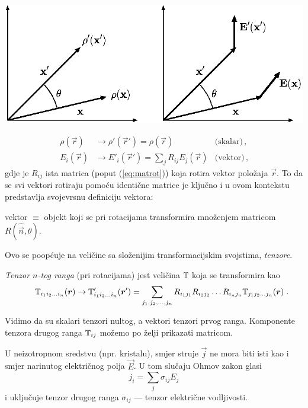 \vspace*{2ex}
\centerline{\includegraphics[scale=0.8]{pics/skalarvektor.eps}}

\begin{align*}
    \rho(\vec{r}) &\to \rho'(\vec{r}') = \rho(\vec{r}) \qquad &\textrm{(skalar)} \,, \\
    E_i(\vec{r}) &\to E'_i(\vec{r}') = \sum_j R_{ij}E_j(\vec{r}) 
                 &\textrm{(vektor)} \,,
\end{align*}
gdje je $R_{ij}$ ista matrica (poput (\ref{eq:matrot})) koja rotira
vektor položaja $\vec{r}$. To da se svi vektori rotiraju pomoću identične
matrice je ključno i u ovom kontekstu predstavlja svojevrsnu definiciju
vektora:
\begin{center}
    {vektor} $\equiv$ {objekt koji se pri rotacijama transformira množenjem matricom}
    $R(\hat{\vec{n}}, \theta)$.
\end{center}
Ovo se poopćuje na veličine sa složenijim transformacijskim svojstima,
\emph{tenzore}. 
\begin{definicija}[Tenzor]
\label{def:tenzor}
\emph{Tenzor $n$-tog ranga} (pri rotacijama)  jest veličina $\mathbb{T}$  koja
se transformira kao
\begin{equation}
 \qquad \bbtensor{T}_{i_1 i_2 \ldots i_n}(\vec{r}) \to \bbtensor{T}'_{i_1 i_2 \ldots i_n}(\vec{r}') =
\sum_{j_1, j_2, \ldots, j_n}
  R_{i_1 j_1}  R_{i_2 j_2} \ldots  R_{i_n j_n} \bbtensor{T}_{j_1 j_2 \ldots j_n}(\vec{r})
 \; . 
\end{equation}
\end{definicija}

Vidimo da su skalari tenzori nultog, a vektori tenzori prvog ranga.
Komponente tenzora drugog ranga $\mathbb{T}_{ij}$
možemo po želji prikazati matricom.

\begin{primjer}
U neizotropnom sredstvu (npr. kristalu), smjer struje $\vec{j}$ ne mora biti isti
kao i smjer narinutog električnog polja $\vec{E}$. U tom slučaju Ohmov zakon
glasi
\begin{equation*}
j_i = \sum_j \sigma_{ij} E_j
\end{equation*}
i uključuje tenzor drugog ranga $\sigma_{ij}$ --- tenzor električne vodljivosti.
\end{primjer}


